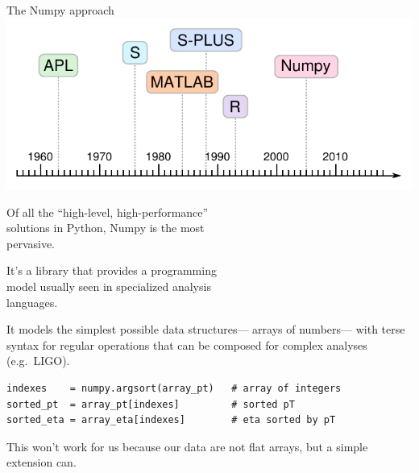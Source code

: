 \documentclass[aspectratio=169]{beamer}
\begin{document}
\begin{frame}[fragile]{The Numpy approach}
\vspace{0.5 cm}
\hfill \includegraphics[height=3 cm]{apl-timeline.pdf}

\vspace{-3 cm}
Of all the ``high-level, high-performance'' \\
solutions in Python, Numpy is the most \\
pervasive.

\vspace{0.5 cm}
It's a library that provides a programming \\
model usually seen in specialized analysis \\
languages.

\vspace{0.5 cm}
It models the simplest possible data structures--- arrays of numbers--- with terse syntax for regular operations that can be composed for complex analyses (e.g.\ LIGO).

\small
\begin{center}
\begin{minipage}{0.9\linewidth}
\begin{verbatim}
indexes    = numpy.argsort(array_pt)   # array of integers
sorted_pt  = array_pt[indexes]         # sorted pT
sorted_eta = array_eta[indexes]        # eta sorted by pT
\end{verbatim}
\end{minipage}
\end{center}

\normalsize
This won't work for us because our data are not flat arrays, but a simple extension can.
\end{frame}
\end{document}
